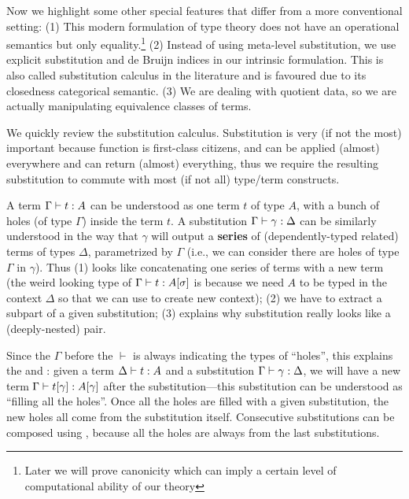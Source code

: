 Now we highlight some other special features that differ from a more
conventional setting: (1) This modern formulation of type theory does not
have an operational semantics but only equality.\footnote{Later we will prove
canonicity which can imply a certain level of computational ability of
our theory}
(2) Instead of using meta-level substitution, we use explicit
substitution and de Bruijn indices in our intrinsic formulation. This is
also called substitution calculus in the literature and is favoured due
to its closedness categorical semantic.
(3) We are dealing with quotient data, so we are actually manipulating
equivalence classes of terms.

We quickly review the substitution calculus.
Substitution is very (if not the most) important because function is
first-class citizens, and can be applied (almost) everywhere and can return
(almost) everything, thus we require the resulting substitution to
commute with most (if not all) type/term constructs. 

A term ${ {\Gamma} \vdash {t} : {A} }$ can be understood as one term $t$ of
type $A$, with a bunch of holes (of type $\Gamma$) inside the term $t$.
A substitution ${ {\Gamma} \vdash {\gamma} : {\Delta} }$ can be similarly
understood in the way that $\gamma$ will output a \textbf{series} of
(dependently-typed related) terms of types $\Delta$, parametrized by
$\Gamma$ (i.e., we can consider there are holes of type $\Gamma$ in $\gamma$).
Thus (1)  looks like concatenating one
series of terms with a new term (the weird looking type of
${ {\Gamma} \vdash {t} : {A[\sigma]} }$ is because we need $A$ to be typed in
the context $\Delta$ so that we can use  to
create new context); (2) we have  to extract a
subpart of a given substitution; (3)  explains why
substitution really looks like a (deeply-nested) pair. 

Since the $\Gamma$ before the $\vdash$ is always indicating the types of
``holes'', this explains the  and : given a term ${ {\Delta} \vdash {t} : {A} }$ and a substitution
${ {\Gamma} \vdash {\gamma} : {\Delta} }$, we will have a new term
${ {\Gamma} \vdash {t[\gamma]} : {A[\gamma]} }$ after the substitution---this
substitution can be understood as ``filling all the holes''. Once all
the holes are filled with a given substitution, the new holes all come
from the substitution itself.
Consecutive substitutions can be composed using , because
all the holes are always from the last substitutions.

